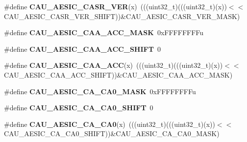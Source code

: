 \begin{DoxyCompactItemize}
\item 
\#define {\bfseries C\+A\+U\+\_\+\+A\+E\+S\+I\+C\+\_\+\+C\+A\+S\+R\+\_\+\+V\+ER}(x)~(((uint32\+\_\+t)(((uint32\+\_\+t)(x))$<$$<$C\+A\+U\+\_\+\+A\+E\+S\+I\+C\+\_\+\+C\+A\+S\+R\+\_\+\+V\+E\+R\+\_\+\+S\+H\+I\+FT))\&C\+A\+U\+\_\+\+A\+E\+S\+I\+C\+\_\+\+C\+A\+S\+R\+\_\+\+V\+E\+R\+\_\+\+M\+A\+SK)\hypertarget{group__CAU__Register__Masks_ga83b8e9f334baf5a5cae0e96e17afa8f8}{}\label{group__CAU__Register__Masks_ga83b8e9f334baf5a5cae0e96e17afa8f8}

\item 
\#define {\bfseries C\+A\+U\+\_\+\+A\+E\+S\+I\+C\+\_\+\+C\+A\+A\+\_\+\+A\+C\+C\+\_\+\+M\+A\+SK}~0x\+F\+F\+F\+F\+F\+F\+F\+Fu\hypertarget{group__CAU__Register__Masks_ga6a186e09605a44795ee98614428823a0}{}\label{group__CAU__Register__Masks_ga6a186e09605a44795ee98614428823a0}

\item 
\#define {\bfseries C\+A\+U\+\_\+\+A\+E\+S\+I\+C\+\_\+\+C\+A\+A\+\_\+\+A\+C\+C\+\_\+\+S\+H\+I\+FT}~0\hypertarget{group__CAU__Register__Masks_gaac1b5dee501da2ddedcc86c0a91246f4}{}\label{group__CAU__Register__Masks_gaac1b5dee501da2ddedcc86c0a91246f4}

\item 
\#define {\bfseries C\+A\+U\+\_\+\+A\+E\+S\+I\+C\+\_\+\+C\+A\+A\+\_\+\+A\+CC}(x)~(((uint32\+\_\+t)(((uint32\+\_\+t)(x))$<$$<$C\+A\+U\+\_\+\+A\+E\+S\+I\+C\+\_\+\+C\+A\+A\+\_\+\+A\+C\+C\+\_\+\+S\+H\+I\+FT))\&C\+A\+U\+\_\+\+A\+E\+S\+I\+C\+\_\+\+C\+A\+A\+\_\+\+A\+C\+C\+\_\+\+M\+A\+SK)\hypertarget{group__CAU__Register__Masks_gac34a260005f2ff88c44b04865363e794}{}\label{group__CAU__Register__Masks_gac34a260005f2ff88c44b04865363e794}

\item 
\#define {\bfseries C\+A\+U\+\_\+\+A\+E\+S\+I\+C\+\_\+\+C\+A\+\_\+\+C\+A0\+\_\+\+M\+A\+SK}~0x\+F\+F\+F\+F\+F\+F\+F\+Fu\hypertarget{group__CAU__Register__Masks_gaf4f3bf1111180d2452151c2c954968ff}{}\label{group__CAU__Register__Masks_gaf4f3bf1111180d2452151c2c954968ff}

\item 
\#define {\bfseries C\+A\+U\+\_\+\+A\+E\+S\+I\+C\+\_\+\+C\+A\+\_\+\+C\+A0\+\_\+\+S\+H\+I\+FT}~0\hypertarget{group__CAU__Register__Masks_gab82f969160eac7bf345cc29560bf2a0a}{}\label{group__CAU__Register__Masks_gab82f969160eac7bf345cc29560bf2a0a}

\item 
\#define {\bfseries C\+A\+U\+\_\+\+A\+E\+S\+I\+C\+\_\+\+C\+A\+\_\+\+C\+A0}(x)~(((uint32\+\_\+t)(((uint32\+\_\+t)(x))$<$$<$C\+A\+U\+\_\+\+A\+E\+S\+I\+C\+\_\+\+C\+A\+\_\+\+C\+A0\+\_\+\+S\+H\+I\+FT))\&C\+A\+U\+\_\+\+A\+E\+S\+I\+C\+\_\+\+C\+A\+\_\+\+C\+A0\+\_\+\+M\+A\+SK)\hypertarget{group__CAU__Register__Masks_gab75a178dc0778fcd48c2287d288ed5c2}{}\label{group__CAU__Register__Masks_gab75a178dc0778fcd48c2287d288ed5c2}


\end{DoxyCompactItemize}
